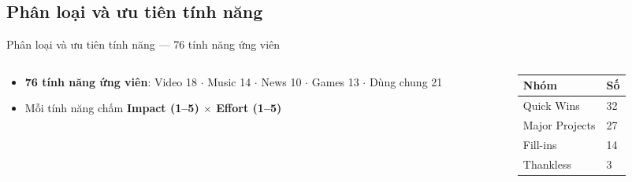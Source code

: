 \subsection{Phân loại và ưu tiên tính năng}
\begin{frame}{Phân loại và ưu tiên tính năng --- 76 tính năng ứng viên}
\begin{columns}[T]
\begin{column}{0.56\textwidth}
\small
\begin{itemize}\setlength{\itemsep}{2pt}
\item \textbf{76 tính năng ứng viên}: Video 18 $\cdot$ Music 14 $\cdot$ News 10 $\cdot$ Games 13 $\cdot$ Dùng chung 21
\item Mỗi tính năng chấm \textbf{Impact (1--5) $\times$ Effort (1--5)}
\end{itemize}
\end{column}
\begin{column}{0.38\textwidth}
\small
\centering
\begin{tabular}{@{}p{3.4cm}p{1.0cm}@{}}
\toprule
\textbf{Nhóm} & \textbf{Số} \\
\midrule
Quick Wins & 32 \\
Major Projects & 27 \\
Fill-ins & 14 \\
Thankless & 3 \\
\bottomrule
\end{tabular}
\end{column}
\end{columns}
\end{frame}

